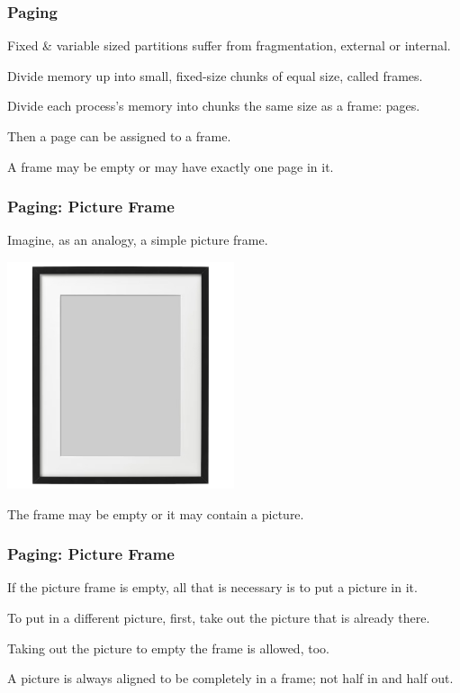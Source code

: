 \begin{frame}
\frametitle{Paging}

Fixed \& variable sized partitions suffer from fragmentation, external or internal. 

Divide memory up into small, fixed-size chunks of equal size, called \alert{frames}. 

Divide each process's memory into chunks the same size as a frame: \alert{pages}. 

Then a page can be assigned to a frame. 

A frame may be empty or may have exactly one page in it. 


\end{frame}

\begin{frame}
\frametitle{Paging: Picture Frame}

Imagine, as an analogy, a simple picture frame. 

\begin{center}
	\includegraphics[width=0.5\textwidth]{images/pictureframe.jpg}
\end{center}

The frame may be empty or it may contain a picture. 

\end{frame}

\begin{frame}
\frametitle{Paging: Picture Frame}

If the picture frame is empty, all that is necessary is to put a picture in it. 

To put in a different picture, first, take out the picture that is already there. 

Taking out the picture to empty the frame is allowed, too. 

A picture is always aligned to be completely in a frame; not half in and half out. 

\end{frame}

